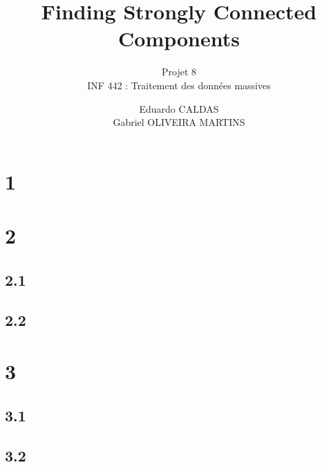 \documentclass[a4paper,12pt,twoside]{article}
\title[Finding Strongly Connected Components INF442]{Finding Strongly Connected Components}
\subtitle{Projet 8 \\ INF 442 : Traitement des données massives}
\author{Eduardo CALDAS \\ Gabriel OLIVEIRA MARTINS}
\begin{document}
\maketitle

\tableofcontents

\newpage

\section{1}
 

\newpage
\section{2}

\subsection{2.1}


\subsection{2.2}

\newpage
\section{3}

\subsection{3.1}

\subsection{3.2}
\end{document}
